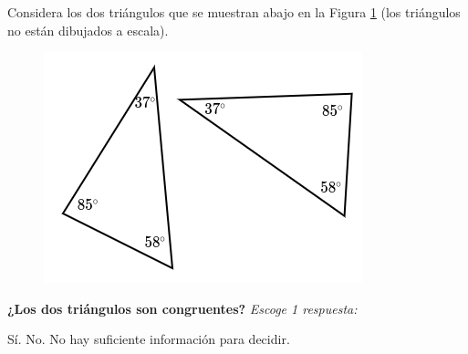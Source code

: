 \question[5] Considera los dos triángulos que se muestran abajo en la Figura \ref{fig:20230323152030} (los triángulos no están dibujados a escala).

\begin{figure}[H]
    \includegraphics[width=0.5\linewidth]{../images/20230323152030}
    \caption{}
    \label{fig:20230323152030}
\end{figure}

\textbf{¿Los dos triángulos son congruentes?}
\emph{Escoge 1 respuesta:}

\begin{choices}
    \choice Sí.
    \choice No.
    \CorrectChoice No hay suficiente información para decidir.
\end{choices}

